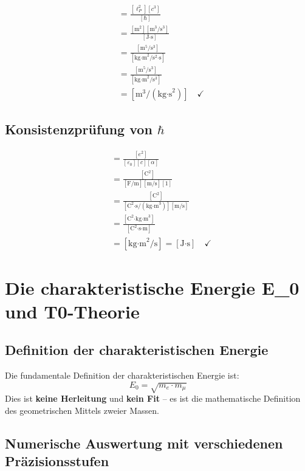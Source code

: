 	\begin{align}
		[G] &= \frac{[\ell_P^2][c^3]}{[\hbar]}\\
		&= \frac{[\text{m}^2][\text{m}^3/\text{s}^3]}{[\text{J·s}]}\\
		&= \frac{[\text{m}^5/\text{s}^3]}{[\text{kg·m}^2/\text{s}^2\text{·s}]}\\
		&= \frac{[\text{m}^5/\text{s}^3]}{[\text{kg·m}^2/\text{s}^3]}\\
		&= [\text{m}^3/(\text{kg·s}^2)] \quad \checkmark
	\end{align}
	
	\subsection{Konsistenzprüfung von $\hbar$}
	
	\begin{align}
		[\hbar] &= \frac{[e^2]}{[\varepsilon_0][c][\alpha]}\\
		&= \frac{[\text{C}^2]}{[\text{F/m}][\text{m/s}][1]}\\
		&= \frac{[\text{C}^2]}{[\text{C}^2\text{·s}/(\text{kg·m}^3)][\text{m/s}]}\\
		&= \frac{[\text{C}^2\text{·kg·m}^3]}{[\text{C}^2\text{·s·m}]}\\
		&= [\text{kg·m}^2/\text{s}] = [\text{J·s}] \quad \checkmark
	\end{align}
	
	\section{Die charakteristische Energie E\_0 und T0-Theorie}
	
	\subsection{Definition der charakteristischen Energie}
	
	\begin{tcolorbox}[colback=blue!5!white,colframe=blue!75!black,title=Grunddefinition]
		Die fundamentale Definition der charakteristischen Energie ist:
		\begin{equation}
			\boxed{E_0 = \sqrt{m_e \cdot m_\mu}}
		\end{equation}
		Dies ist \textbf{keine Herleitung} und \textbf{kein Fit} -- es ist die mathematische Definition des geometrischen Mittels zweier Massen.
	\end{tcolorbox}
	
	\subsection{Numerische Auswertung mit verschiedenen Präzisionsstufen}
	

